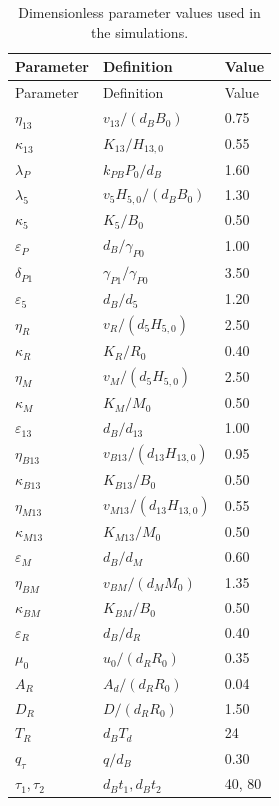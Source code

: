 \documentclass[11pt]{article}
\begin{document}
\begin{longtable}{lll}
\caption{Dimensionless parameter values used in the simulations.}\\
\toprule
Parameter & Definition & Value\\
\midrule
\endfirsthead
\toprule
Parameter & Definition & Value\\
\midrule
\endhead
\bottomrule
\endfoot
\(\eta_{13}\) & \(v_{13}/(d_BB_0)\) & 0.75\\
\(\kappa_{13}\) & \(K_{13}/H_{13,0}\) & 0.55\\
\(\lambda_P\) & \(k_{PB}P_0/d_B\) & 1.60\\
\(\lambda_5\) & \(v_5H_{5,0}/(d_BB_0)\) & 1.30\\
\(\kappa_5\) & \(K_5/B_0\) & 0.50\\
\(\varepsilon_P\) & \(d_B/\gamma_{P0}\) & 1.00\\
\(\delta_{P1}\) & \(\gamma_{P1}/\gamma_{P0}\) & 3.50\\
\(\varepsilon_5\) & \(d_B/d_5\) & 1.20\\
\(\eta_R\) & \(v_R/(d_5H_{5,0})\) & 2.50\\
\(\kappa_R\) & \(K_R/R_0\) & 0.40\\
\(\eta_M\) & \(v_M/(d_5H_{5,0})\) & 2.50\\
\(\kappa_M\) & \(K_M/M_0\) & 0.50\\
\(\varepsilon_{13}\) & \(d_B/d_{13}\) & 1.00\\
\(\eta_{B13}\) & \(v_{B13}/(d_{13}H_{13,0})\) & 0.95\\
\(\kappa_{B13}\) & \(K_{B13}/B_0\) & 0.50\\
\(\eta_{M13}\) & \(v_{M13}/(d_{13}H_{13,0})\) & 0.55\\
\(\kappa_{M13}\) & \(K_{M13}/M_0\) & 0.50\\
\(\varepsilon_M\) & \(d_B/d_M\) & 0.60\\
\(\eta_{BM}\) & \(v_{BM}/(d_MM_0)\) & 1.35\\
\(\kappa_{BM}\) & \(K_{BM}/B_0\) & 0.50\\
\(\varepsilon_R\) & \(d_B/d_R\) & 0.40\\
\(\mu_0\) & \(u_0/(d_RR_0)\) & 0.35\\
\(A_R\) & \(A_d/(d_RR_0)\) & 0.04\\
\(D_R\) & \(D/(d_RR_0)\) & 1.50\\
\(T_R\) & \(d_BT_d\) & 24\\
\(q_\tau\) & \(q/d_B\) & 0.30\\
\(\tau_1,\tau_2\) & \(d_Bt_1,d_Bt_2\) & 40, 80\\

\end{longtable}
\end{document}
